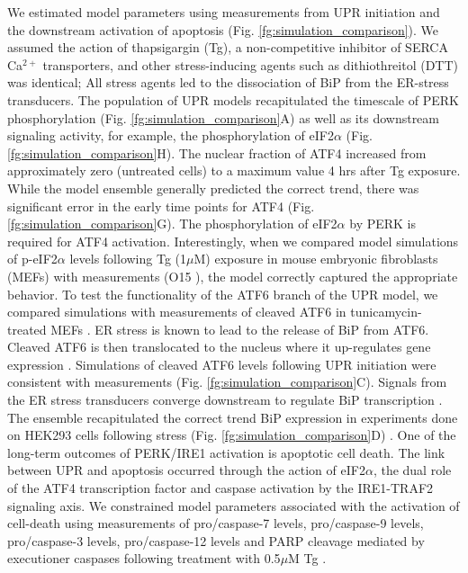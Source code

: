 \documentclass[fleqn,10pt]{wlscirep}
\begin{document}
We estimated model parameters using measurements from UPR initiation and the downstream activation of apoptosis (Fig. \ref{fg:simulation_comparison}).
We assumed the action of thapsigargin (Tg), a non-competitive inhibitor of SERCA Ca$^{2+}$ transporters, and other stress-inducing agents such as dithiothreitol (DTT) was identical;
All stress agents led to the dissociation of BiP from the ER-stress transducers.
The population of UPR models recapitulated the timescale of PERK phosphorylation (Fig. \ref{fg:simulation_comparison}A) as well as its downstream signaling activity, for example, the phosphorylation of eIF2$\alpha$ (Fig. \ref{fg:simulation_comparison}H).
The nuclear fraction of ATF4 increased from approximately zero (untreated cells) to a maximum value 4 hrs after Tg exposure.
While the model ensemble generally predicted the correct trend, there was significant error in the early time points for ATF4 (Fig. \ref{fg:simulation_comparison}G).
The phosphorylation of eIF2$\alpha$ by PERK is required for ATF4 activation. Interestingly, when we compared model simulations of p-eIF2$\alpha$ levels following Tg (1$\mu$M) exposure in mouse embryonic fibroblasts (MEFs) with measurements (O15 \cite{yamamoto2007tim}), the model correctly captured the appropriate behavior.
To test the functionality of the ATF6 branch of the UPR model, we compared simulations with measurements of cleaved ATF6 in tunicamycin-treated MEFs \cite{lee2002imu}.
ER stress is known to lead to the release of BiP from ATF6.
Cleaved ATF6 is then translocated to the nucleus where it up-regulates gene expression \cite{silver1999mtf,hai1989tfa}.
Simulations of cleaved ATF6 levels following UPR initiation were consistent with measurements (Fig. \ref{fg:simulation_comparison}C).
Signals from the ER stress transducers converge downstream to regulate BiP transcription \cite{malhotra2007era, rao2004mpe,kokame2001iei, yoshida2000aap}.
The ensemble recapitulated the correct trend BiP expression in experiments done on HEK293 cells following stress (Fig. \ref{fg:simulation_comparison}D) \cite{lin2007ire1}.
One of the long-term outcomes of PERK/IRE1 activation is apoptotic cell death.
The link between UPR and apoptosis occurred through the action of eIF2$\alpha$, the dual role of the ATF4 transcription factor and caspase activation by the IRE1-TRAF2 signaling axis.
We constrained model parameters associated with the activation of cell-death using measurements of pro/caspase-7 levels, pro/caspase-9 levels, pro/caspase-3 levels, pro/caspase-12 levels and PARP cleavage mediated by executioner caspases following treatment with 0.5$\mu$M Tg \cite{rao2002cer}.
\end{document}
